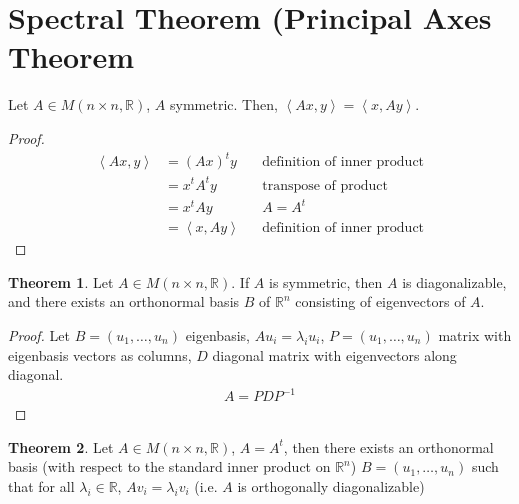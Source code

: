 \documentclass[letterpaper,12pt]{article}
\theoremstyle{definition}
\newtheorem*{theorem}{Theorem}
\newcommand{\inp}[2]{\left< #1, #2 \right>}
\begin{document}
\section*{Spectral Theorem (Principal Axes Theorem}
Let $A \in M(n \times n, \mathbb{R})$, $A$ symmetric. Then, $\inp{Ax}{y} = \inp{x}{Ay}$.
\begin{proof}
\begin{align*}
    \inp{Ax}{y} & = (Ax)^t y && \text{definition of inner product} \\
    & = x^t A^t y && \text{transpose of product} \\
    & = x^t Ay && \text{$A = A^t$} \\
    & = \inp{x}{Ay} && \text{definition of inner product}
\end{align*}
\end{proof}

\begin{theorem}
Let $A \in M(n \times n, \mathbb{R})$. If $A$ is symmetric, then $A$ is diagonalizable, and there exists an orthonormal basis $B$ of $\mathbb{R}^n$ consisting of eigenvectors of $A$.
\end{theorem}
\begin{proof}
Let $B = (u_1, \dots, u_n)$ eigenbasis, $Au_i = \lambda_i u_i$, $P = (u_1, \dots, u_n)$ matrix with eigenbasis vectors as columns, $D$ diagonal matrix with eigenvectors along diagonal.
\begin{align*}
    A = PDP^{-1}
\end{align*}
\end{proof}

\begin{theorem}
Let $A \in M(n \times n, \mathbb{R})$, $A = A^t$, then there exists an orthonormal basis (with respect to the standard inner product on $\mathbb{R}^n$) $B = (u_1, \dots, u_n)$ such that for all $\lambda_i \in \mathbb{R}$, $Av_i = \lambda_i v_i$ (i.e. $A$ is orthogonally diagonalizable)
\end{theorem}
\end{document}
